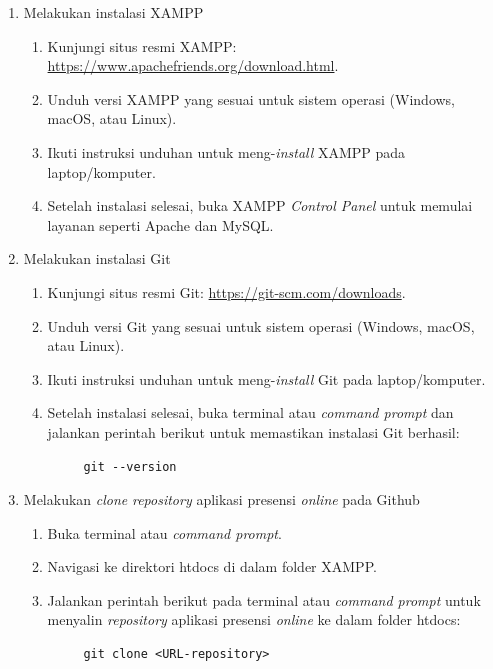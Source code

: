 \begin{enumerate}
    \item Melakukan instalasi XAMPP
    \begin{enumerate}
        \item Kunjungi situs resmi XAMPP: \url{https://www.apachefriends.org/download.html}.
        \item Unduh versi XAMPP yang sesuai untuk sistem operasi (Windows, macOS, atau Linux).
        \item Ikuti instruksi unduhan untuk meng-\textit{install} XAMPP pada laptop/komputer.
        \item Setelah instalasi selesai, buka XAMPP \textit{Control Panel} untuk memulai layanan seperti Apache dan MySQL.
    \end{enumerate}
    
    \item Melakukan instalasi Git
        \begin{enumerate}
        \item Kunjungi situs resmi Git: \url{https://git-scm.com/downloads}.
        \item Unduh versi Git yang sesuai untuk sistem operasi (Windows, macOS, atau Linux).
        \item Ikuti instruksi unduhan untuk meng-\textit{install} Git pada laptop/komputer.
        \item Setelah instalasi selesai, buka terminal atau \textit{command prompt} dan jalankan perintah berikut untuk memastikan instalasi Git berhasil:
        {\small\begin{verbatim}     git --version
\end{verbatim}}
    \end{enumerate}

    \item Melakukan \textit{clone} \textit{repository} aplikasi presensi \textit{online} pada Github
    \begin{enumerate}
        \item Buka terminal atau \textit{command prompt}.
        \item Navigasi ke direktori htdocs di dalam folder XAMPP.
        \item Jalankan perintah berikut pada terminal atau \textit{command prompt} untuk menyalin \textit{repository} aplikasi presensi \textit{online} ke dalam folder htdocs:
        {\small\begin{verbatim}     git clone <URL-repository>
\end{verbatim}}
    \end{enumerate}


\end{enumerate}
